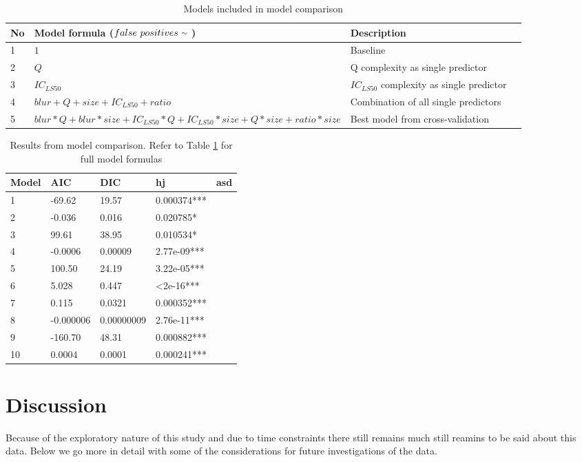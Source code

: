 \documentclass[12pt]{article}
\newcommand{\mytilde}{\raise.17ex\hbox{$\scriptstyle\mathtt{\sim}$}} %
\begin{document}
\begin{table}[ht]
	\caption{Models included in model comparison}
	\tiny
	\begin{tabular}{@{}lllr@{}} 
		\toprule
		No & Model formula ($false \ positives \ \mytilde \ $) & Description \\ 
		\midrule
		1 & $1$ & Baseline \\
		2 & $Q$ & Q complexity as single predictor \\
		3 & $IC_{LS50}$ & $IC_{LS50}$ complexity as single predictor  \\
		4 & $blur + Q + size + IC_{LS50} + ratio$ & Combination of all single predictors  \\
		5 & $blur*Q + blur*size + IC_{LS50}*Q + IC_{LS50}*size + Q*size + ratio*size$ & Best model from cross-validation \\
		\bottomrule
	\end{tabular}
	\label{tab:comparedmodels}
\end{table}


\begin{table}[ht]
	\caption{Results from model comparison. Refer to Table \ref{tab:comparedmodels} for full model formulas}
	\begin{tabular}{@{}llllr@{}}
		\toprule
		Model & AIC & DIC & hj & asd \\ 
		\midrule
		1 & -69.62 & 19.57 & 0.000374***\\
		2 & -0.036 & 0.016 & 0.020785*\\
		3 & 99.61 & 38.95 &  0.010534*\\
		4 & -0.0006 & 0.00009 & 2.77e-09***\\
		5 & 100.50 & 24.19 & 3.22e-05***\\
		6 & 5.028 & 0.447 &  \textless 2e-16***\\
		7 & 0.115 & 0.0321 & 0.000352***\\
		8 & -0.000006 & 0.00000009 & 2.76e-11***\\
		9 & -160.70 & 48.31 & 0.000882*** \\
		10 &  0.0004 & 0.0001 & 0.000241***\\
		\bottomrule
	\end{tabular}
	\label{tab:modelcomparison}
\end{table}


\section{Discussion}
Because of the exploratory nature of this study and due to time constraints there still remains much still reamins to be said about this data. Below we go more in detail with some of the considerations for future investigations of the data.
\end{document}

